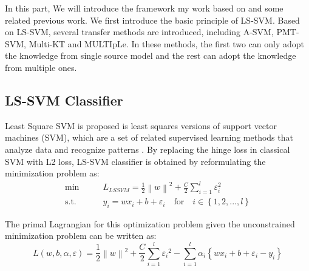 In this part, We will introduce the framework my work based on and some related previous work. We first introduce the basic principle of LS-SVM. Based on LS-SVM, several transfer methods are introduced, including A-SVM, PMT-SVM, Multi-KT and MULTIpLe. In these methods, the first two can only adopt the knowledge from single source model and the rest can adopt the knowledge from multiple ones.
\subsection{LS-SVM Classifier} \label{sec:single:lssvm}
Least Square SVM is proposed is least squares versions of support vector machines (SVM), which are a set of related supervised learning methods that analyze data and recognize patterns \cite{suykens1999least}. By replacing the hinge loss in classical SVM with L2 loss, LS-SVM classifier is obtained by reformulating the minimization problem as: 
\begin{equation}\label{eq:gama:lssvm}
\begin{aligned}
\min \qquad& L_{LSSVM} = \frac{1}{2}{\left\| w \right\|^2} + \frac{C}{2}\sum\limits_{i = 1}^l {{\varepsilon_i ^2}}\\
\text{s.t.}\qquad&{y_i} = w{x_i} + b + {\varepsilon _i} \quad   \text{for} \quad i \in \left\{ {1,2,...,l} \right\}
\end{aligned}
\end{equation}

The primal Lagrangian for this optimization problem given the unconstrained minimization problem can be written as:
\begin{equation}\label{sq:gama:lsprime}
  L\left( {w,b,\alpha ,\varepsilon } \right) = \frac{1}{2}{\left\| w \right\|^2} + \frac{C}{2}\sum\limits_{i = 1}^l {{\varepsilon _i}^2}  - \sum\limits_{i = 1}^l {{\alpha _i}\left\{ {w{x_i} + b + {\varepsilon _i} - {y_i}} \right\}}
\end{equation}

